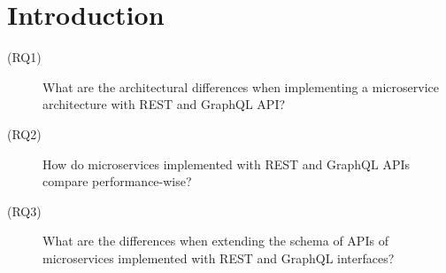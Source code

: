 \section{Introduction}\label{sec:introduction}

\begin{description}
    \item[(RQ1)] What are the architectural differences when implementing a microservice architecture with \ac{REST} and GraphQL \ac{API}?
    \item[(RQ2)] How do microservices implemented with \ac{REST} and GraphQL \acp{API} compare performance-wise?
    \item[(RQ3)] What are the differences when extending the schema of \acp{API} of microservices implemented with \ac{REST} and GraphQL interfaces?  
\end{description}